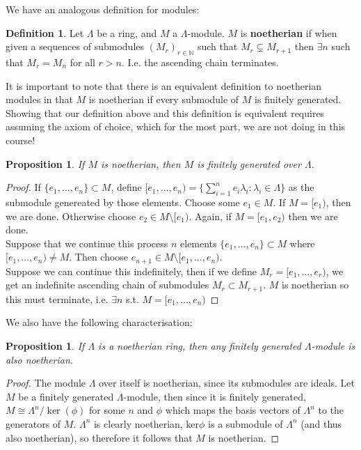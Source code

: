 \documentclass[12pt]{book}
\newtheorem{proposition}[theorem]{Proposition}
\theoremstyle{definition}
\newtheorem{definition}[theorem]{Definition}
\begin{document}
We have an analogous definition for modules: 

\begin{definition}
    Let $\Lambda$ be a ring, and $M$ a $\Lambda$-module. $M$ is \textbf{noetherian} if when given a sequences of submodules $(M_r)_{r \in \mathbb{N}}$ such that $M_r \subsetneq M_{r+1}$ then $\exists n$ such that $M_r = M_n$ for all $r >n$. I.e. the ascending chain terminates. 
\end{definition}

It is important to note that there is an equivalent definition to noetherian modules in that $M$ is noetherian if every submodule of $M$ is finitely generated. Showing that our definition above and this definition is equivalent requires assuming the axiom of choice, which for the most part, we are not doing in this course!

\begin{proposition}
    If $M$ is noetherian, then $M$ is finitely generated over $\Lambda$.     
\end{proposition}
\begin{proof}
    If $\{e_1, \dots, e_n\} \subset M$, define $[e_1, \dots, e_n) = \{\sum^n_{i=1}e_i \lambda_i : \lambda_i \in \Lambda\}$ as the submodule genereated by those elements.
    Choose some $e_1 \in M$. If $M = [e_1)$, then we are done. Otherwise choose $e_2 \in M\setminus [e_1)$. Again, if $M = [e_1, e_2)$ then we are done.\\ Suppose that we continue this process $n$ elements $\{e_1, \dots, e_n\} \subset M$ where $[e_1, \dots, e_n) \neq M$. Then choose $e_{n+1} \in M \setminus [e_1, \dots, e_n)$. \\Suppose we can continue this indefinitely, then if we define $M_r = [e_1, \dots, e_r)$, we get an indefinite ascending chain of submodules $M_r \subset M_{r+1}$. $M$ is noetherian so this must terminate, i.e. $\exists n$ s.t. $M = [e_1, \dots, e_n)$
\end{proof}

We also have the following characterisation: 

\begin{proposition}
    If $\Lambda$ is a noetherian ring, then any finitely generated $\Lambda$-module is also noetherian. 
\end{proposition}
\begin{proof}
    The module $\Lambda$ over itself is noetherian, since its submodules are ideals. Let $M$ be a finitely generated $\Lambda$-module, then since it is finitely generated, $M \cong \Lambda^n/\ker(\phi)$ for some $n$ and $\phi$ which maps the basis vectors of $\Lambda^n$ to the generators of $M$. $\Lambda^n$ is clearly noetherian, ker$\phi$ is a submodule of $\Lambda^n$ (and thus also noetherian), so therefore it follows that $M$ is noetherian. 
\end{proof}
\end{document}
